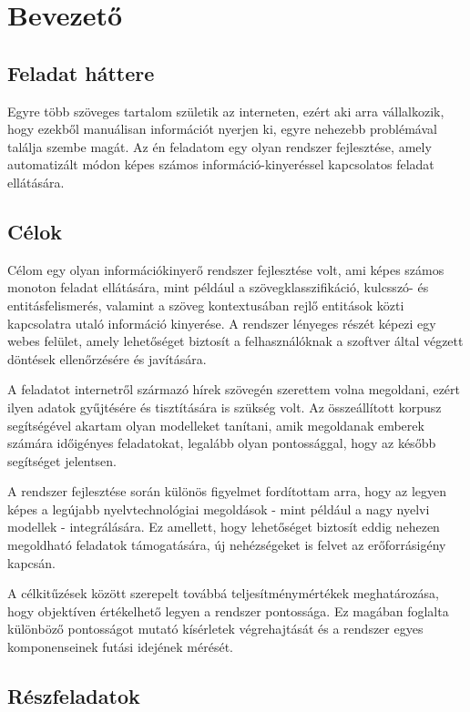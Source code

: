 \chapter{Bevezető}

\section{Feladat háttere}

Egyre több szöveges tartalom születik az interneten, ezért aki arra vállalkozik, hogy ezekből manuálisan információt nyerjen ki, egyre nehezebb problémával találja szembe magát. Az én feladatom egy olyan rendszer fejlesztése, amely automatizált módon képes számos információ-kinyeréssel kapcsolatos feladat ellátására.

\section{Célok}

Célom egy olyan információkinyerő rendszer fejlesztése volt, ami képes számos monoton feladat ellátására, mint például a szövegklasszifikáció, kulcsszó- és entitásfelismerés, valamint a szöveg kontextusában rejlő entitások közti kapcsolatra utaló információ kinyerése. A rendszer lényeges részét képezi egy webes felület, amely lehetőséget biztosít a felhasználóknak a szoftver által végzett döntések ellenőrzésére és javítására.

A feladatot internetről származó hírek szövegén szerettem volna megoldani, ezért ilyen adatok gyűjtésére és tisztítására is szükség volt. Az összeállított korpusz segítségével akartam olyan modelleket tanítani, amik megoldanak emberek számára időigényes feladatokat, legalább olyan pontossággal, hogy az később segítséget jelentsen.

A rendszer fejlesztése során különös figyelmet fordítottam arra, hogy az legyen képes a legújabb nyelvtechnológiai megoldások - mint például a nagy nyelvi modellek - integrálására. Ez amellett, hogy lehetőséget biztosít eddig nehezen megoldható feladatok támogatására, új nehézségeket is felvet az erőforrásigény kapcsán.

A célkitűzések között szerepelt továbbá teljesítménymértékek meghatározása, hogy objektíven értékelhető legyen a rendszer pontossága. Ez magában foglalta különböző pontosságot mutató kísérletek végrehajtását és a rendszer egyes komponenseinek futási idejének mérését.

\section{Részfeladatok}

